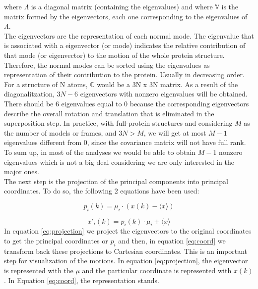 \documentclass[12pt]{article}
\begin{document}
where $\Lambda$ is a diagonal matrix (containing the eigenvalues) and where $\mathbb{V}$ is the matrix formed by the eigenvectors, each one corresponding to the eigenvalues of $\Lambda$.\\

The eigenvectors are the representation of each normal mode. The eigenvalue that is associated with a eigenvector (or mode) indicates the relative contribution of that mode (or eigenvector) to the motion of the whole protein structure.\citep{Gargallo2003}\\

Therefore, the normal modes can be sorted using the eigenvalues as representation of their contribution to the protein. Usually in decreasing order. For a structure of N atoms, $\mathbb{C}$ would be a 3N x 3N matrix. As a result of the diagonalitzation, $3N − 6$ eigenvectors with nonzero eigenvalues will be obtained. There should be 6 eigenvalues equal to 0 because the corresponding eigenvectors describe the overall rotation and translation that is eliminated in the superposition step. In practice, with full-protein structures and considering $M$ as the number of models or frames, and $3N > M$, we will get at most $M-1$ eigenvalues different from $0$, since the covariance matrix will not have full rank. To sum up, in most of the analyses we would be able to obtain $M-1$ nonzero eigenvalues which is not a big deal considering we are only interested in the major ones\citep{Hayward2008}.\\ 

The next step is the projection of the principal components into principal coordinates. To do so, the following 2 equations have been used:

\begin{equation}
p_{i}(k)=\mu_{i}\cdot (x(k) - \langle x \rangle) 
\label{eq:projection}
\end{equation}

\begin{equation}
x'_{i}(k)=p_{i}(k) \cdot \mu_{i} +  \langle x \rangle
\label{eq:coord}
\end{equation}
In equation \eqref{eq:projection} we project the eigenvectors to the original coordinates to get the principal coordinates or $p_{i}$ and then, in equation \eqref{eq:coord} we transform back these projections to Cartesian coordinates. This is an important step for visualization of the motions. In equation \eqref{eq:projection}, the eigenvector is represented with the $\mu$ and the particular coordinate is represented with $x(k)$. In Equation \eqref{eq:coord}, the representation stands.\citep{Hayward2008}
\clearpage
\end{document}
